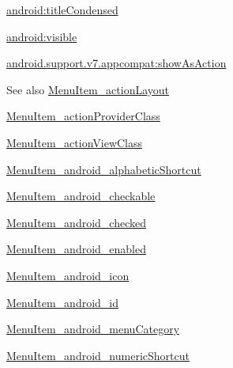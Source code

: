 {\ttfamily \hyperlink{classandroid_1_1support_1_1v7_1_1appcompat_1_1R_1_1styleable_a8c8d837f91a27ff093a0935e00483f56}{android\+:title\+Condensed}}

{\ttfamily \hyperlink{classandroid_1_1support_1_1v7_1_1appcompat_1_1R_1_1styleable_aebbb1f4365cda37ee838c1def4ab0774}{android\+:visible}}

{\ttfamily \hyperlink{classandroid_1_1support_1_1v7_1_1appcompat_1_1R_1_1styleable_a1de0f110dc9609ff73b8af75f8d563ed}{android.\+support.\+v7.\+appcompat\+:show\+As\+Action}}

\begin{DoxySeeAlso}{See also}
\hyperlink{classandroid_1_1support_1_1v7_1_1appcompat_1_1R_1_1styleable_aa9ccfaac0ff76dfb80ddd32e3aaa8cdd}{Menu\+Item\+\_\+action\+Layout} 

\hyperlink{classandroid_1_1support_1_1v7_1_1appcompat_1_1R_1_1styleable_ac073414cb46c8a3e83defa8389f0edf3}{Menu\+Item\+\_\+action\+Provider\+Class} 

\hyperlink{classandroid_1_1support_1_1v7_1_1appcompat_1_1R_1_1styleable_aa4c4c88d63a6e2feeb8ed1bf4b4ee9ed}{Menu\+Item\+\_\+action\+View\+Class} 

\hyperlink{classandroid_1_1support_1_1v7_1_1appcompat_1_1R_1_1styleable_a38db6569328350109b52ba3309f4acea}{Menu\+Item\+\_\+android\+\_\+alphabetic\+Shortcut} 

\hyperlink{classandroid_1_1support_1_1v7_1_1appcompat_1_1R_1_1styleable_a1433c4a05cbb355a72bedbab97afd46d}{Menu\+Item\+\_\+android\+\_\+checkable} 

\hyperlink{classandroid_1_1support_1_1v7_1_1appcompat_1_1R_1_1styleable_a66e284a7841a55ccafec733792f58b10}{Menu\+Item\+\_\+android\+\_\+checked} 

\hyperlink{classandroid_1_1support_1_1v7_1_1appcompat_1_1R_1_1styleable_a103c4fa89f60f64ac3088a849b02a58e}{Menu\+Item\+\_\+android\+\_\+enabled} 

\hyperlink{classandroid_1_1support_1_1v7_1_1appcompat_1_1R_1_1styleable_a78b2cf536eb665f433feaa539b904381}{Menu\+Item\+\_\+android\+\_\+icon} 

\hyperlink{classandroid_1_1support_1_1v7_1_1appcompat_1_1R_1_1styleable_a4ba49d8b037ce6465e4c632c336e8363}{Menu\+Item\+\_\+android\+\_\+id} 

\hyperlink{classandroid_1_1support_1_1v7_1_1appcompat_1_1R_1_1styleable_a9c6e0b2ed82827b95fcff2fbf9f39051}{Menu\+Item\+\_\+android\+\_\+menu\+Category} 

\hyperlink{classandroid_1_1support_1_1v7_1_1appcompat_1_1R_1_1styleable_aee6f9bc59bc0547644270a50ba642e63}{Menu\+Item\+\_\+android\+\_\+numeric\+Shortcut} 


\end{DoxySeeAlso}
